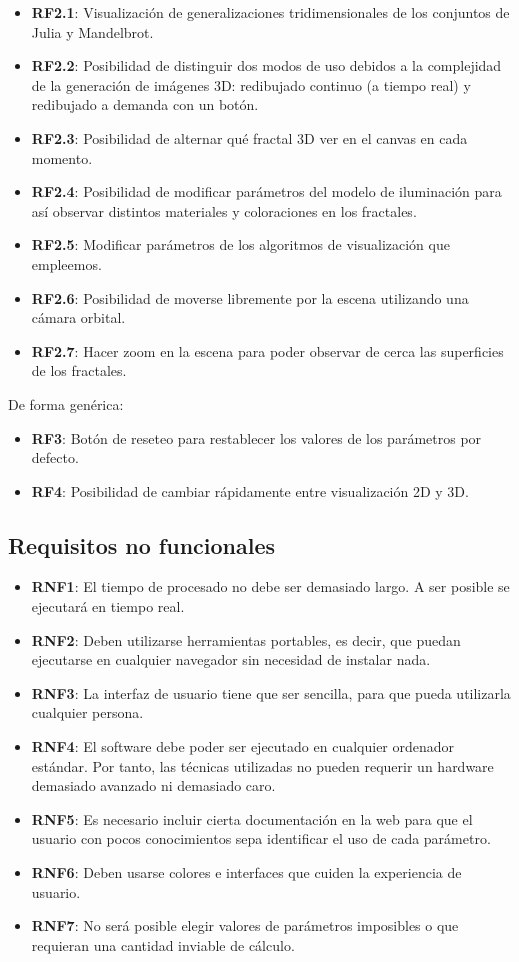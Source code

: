 \begin{itemize}
    \item \textbf{RF2.1}: Visualización de generalizaciones tridimensionales de los conjuntos de Julia y Mandelbrot.
    \item \textbf{RF2.2}: Posibilidad de distinguir dos modos de uso debidos a la complejidad de la generación de imágenes 3D: redibujado continuo (a tiempo real) y redibujado a demanda con un botón.
    \item \textbf{RF2.3}: Posibilidad de alternar qué fractal 3D ver en el canvas en cada momento.
    \item \textbf{RF2.4}: Posibilidad de modificar parámetros del modelo de iluminación para así observar distintos materiales y coloraciones en los fractales.
    \item \textbf{RF2.5}: Modificar parámetros de los algoritmos de visualización que empleemos.
    \item \textbf{RF2.6}: Posibilidad de moverse libremente por la escena utilizando una cámara orbital.
    \item \textbf{RF2.7}: Hacer zoom en la escena para poder observar de cerca las superficies de los fractales.
\end{itemize}
De forma genérica:
\begin{itemize}
    \item \textbf{RF3}: Botón de reseteo para restablecer los valores de los parámetros por defecto.
    \item \textbf{RF4}: Posibilidad de cambiar rápidamente entre visualización 2D y 3D.
\end{itemize}

\subsection{Requisitos no funcionales}

\begin{itemize}
    \item \textbf{RNF1}: El tiempo de procesado no debe ser demasiado largo. A ser posible se ejecutará en tiempo real.
    \item \textbf{RNF2}: Deben utilizarse herramientas portables, es decir, que puedan ejecutarse en cualquier navegador sin necesidad de instalar nada.
    \item \textbf{RNF3}: La interfaz de usuario tiene que ser sencilla, para que pueda utilizarla cualquier persona.
    \item \textbf{RNF4}: El software debe poder ser ejecutado en cualquier ordenador estándar. Por tanto, las técnicas utilizadas no pueden requerir un hardware demasiado avanzado ni demasiado caro.
    \item \textbf{RNF5}: Es necesario incluir cierta documentación en la web para que el usuario con pocos conocimientos sepa identificar el uso de cada parámetro.
    \item \textbf{RNF6}: Deben usarse colores e interfaces que cuiden la experiencia de usuario.
    \item \textbf{RNF7}: No será posible elegir valores de parámetros imposibles o que requieran una cantidad inviable de cálculo.
\end{itemize}

